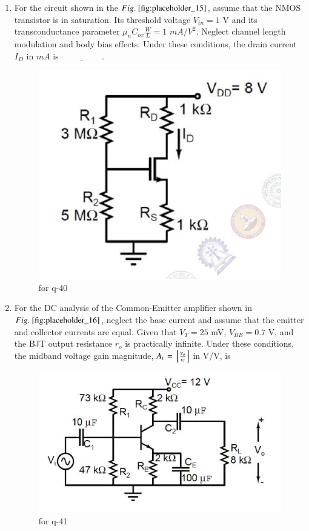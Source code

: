 \documentclass[journal,12pt,onecolumn]{IEEEtran}
\theoremstyle{remark}
\begin{document}
\begin{enumerate}
\hfill {}

\item For the circuit shown in the $\figref{fig:placeholder_15}$, assume that the NMOS transistor is in saturation. Its threshold voltage $V_{tn} = 1$ V and its transconductance parameter $\mu_n C_{ox} \frac{W}{L} = 1$ $mA/V^2$. Neglect channel length modulation and body bias effects. Under these conditions, the drain current $I_D$ in $mA$ is $\underline{\hspace{2cm}}$.
\begin{figure}[H]
    \centering
    \includegraphics[width=0.5\columnwidth]{figs/15.png}
    \caption{\centering for q-40}
    \label{fig:placeholder_15}
\end{figure}
\hfill {}

\item For the DC analysis of the Common-Emitter amplifier shown in $\figref{fig:placeholder_16}$, neglect the base current and assume that the emitter and collector currents are equal. Given that $V_T = 25$ mV, $V_{BE} = 0.7$ V, and the BJT output resistance $r_o$ is practically infinite. Under these conditions, the midband voltage gain magnitude, $A_v = {}\left[\frac{v_o}{v_i}\right]$ in V/V, is
\begin{figure}[H]
    \centering
    \includegraphics[width=0.5\columnwidth]{figs/16.png}
    \caption{\centering for q-41}
    \label{fig:placeholder_16}
\end{figure}
\hfill {}


\end{enumerate}
\end{document}
